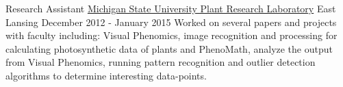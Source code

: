 \begin{cventries}
  \cventry
    {Research Assistant}
    {\href{https://prl.natsci.msu.edu/research-tech/center-for-advanced-algal-and-plant-phenotyping}{Michigan State University Plant Research Laboratory}}
    {East Lansing}
    {December 2012 - January 2015}
    {
      {Worked on several papers and projects with faculty including: Visual Phenomics, image recognition
      and processing for calculating photosynthetic data of plants and PhenoMath, analyze the output from Visual Phenomics,
      running pattern recognition and outlier detection algorithms to determine interesting data-points. }
    }
\end{cventries}
